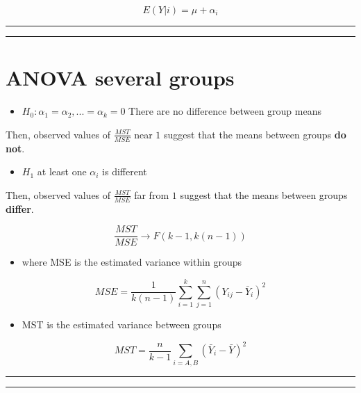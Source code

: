 \documentclass[
]{book}
\providecommand{\tightlist}{%
  \setlength{\itemsep}{0pt}\setlength{\parskip}{0pt}}
\begin{document}
\[E(Y|i)=\mu + \alpha_i\]

\begin{center}\rule{0.5\linewidth}{0.5pt}\end{center}

\begin{center}\rule{0.5\linewidth}{0.5pt}\end{center}

\hypertarget{anova-several-groups-1}{%
\section{ANOVA several groups}\label{anova-several-groups-1}}

\begin{itemize}
\tightlist
\item
  \(H_0: \alpha_1=\alpha_2, ...=\alpha_k=0\) There are no difference between group means
\end{itemize}

Then, observed values of \(\frac{MST}{MSE}\) near \(1\) suggest that the means between groups \textbf{do not}.

\begin{itemize}
\tightlist
\item
  \(H_1\) at least one \(\alpha_i\) is different
\end{itemize}

Then, observed values of \(\frac{MST}{MSE}\) far from \(1\) suggest that the means between groups \textbf{differ}.

\[\frac{MST}{MSE} \rightarrow F(k-1, k(n-1))\]

\begin{itemize}
\tightlist
\item
  where MSE is the estimated variance within groups
\end{itemize}

\[MSE=\frac{1}{k(n-1)} \sum_{i=1}^k\sum_{j=1}^n(Y_{ij}-\bar{Y}_i)^2\]

\begin{itemize}
\tightlist
\item
  MST is the estimated variance between groups
\end{itemize}

\[MST= \frac{n}{k-1}\sum_{i=A,B}(\bar{Y}_{i}-\bar{Y})^2\]

\begin{center}\rule{0.5\linewidth}{0.5pt}\end{center}

\begin{center}\rule{0.5\linewidth}{0.5pt}\end{center}
\end{document}
